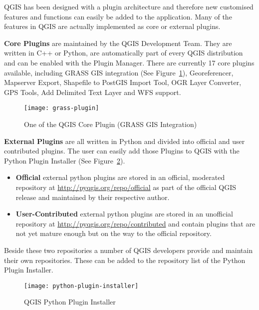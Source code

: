 QGIS has been designed with a plugin architecture and therefore new
customised features and functions can easily be added to the application.
Many of the features in QGIS are actually implemented as core or external
plugins. 

\textbf{Core Plugins} are maintained by the QGIS Development Team. They are
written in C++ or Python, are automatically part of every QGIS distribution
and can be enabled with the Plugin Manager. There are currently 17 core
plugins available, including GRASS GIS integration (See
Figure~\ref{fig:grass-plugin}), Georeferencer, Mapserver Export, Shapefile to
PostGIS Import Tool, OGR Layer Converter, GPS Tools, Add Delimited Text Layer
and WFS support.

\begin{figure}[h]
   \begin{center}
   \caption{One of the QGIS Core Plugin (GRASS GIS Integration)}
    \label{fig:grass-plugin}\smallskip
   \texttt{[image: grass-plugin]}
\end{center}
\end{figure}

\textbf{External Plugins} are all written in Python and divided into official
and user contributed plugins. The user can easily add those Plugins to QGIS
with the Python Plugin Installer (See Figure~\ref{fig:python-plugin}).

\begin{itemize}
\item \textbf{Official} external python plugins are stored in an official,
moderated repository at \url{http://pyqgis.org/repo/official} as part of the
official QGIS release and maintained by their respective author.
\item \textbf{User-Contributed} external python plugins are stored in an
unofficial repository at \url{http://pyqgis.org/repo/contributed} and contain
plugins that are not yet mature enough but on the way to the official
repository.
\end{itemize}

Beside these two repositories a number of QGIS developers provide and maintain
their own repositories. These can be added to the repository list of the
Python Plugin Installer.

\begin{figure}[h]
   \begin{center}
   \caption{QGIS Python Plugin Installer}\label{fig:python-plugin}\smallskip
   \texttt{[image: python-plugin-installer]}
\end{center}
\end{figure}

